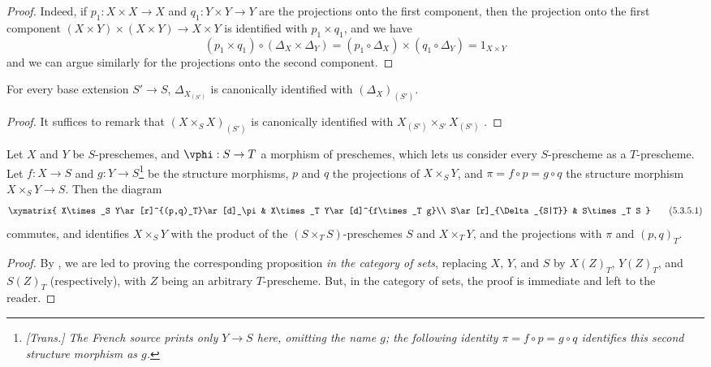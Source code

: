 \begin{proof}
Indeed, if $p_1:X\times X\to X$ and $q_1:Y\times Y\to Y$ are the projections onto the first component, then the projection onto the first component $(X\times Y)\times(X\times Y)\to X\times Y$ is identified with $p_1\times q_1$, and we have
\[
  (p_1\times q_1)\circ(\Delta_X\times\Delta_Y)=(p_1\circ\Delta_X)\times(q_1\circ\Delta_Y)=1_{X\times Y}
\]
and we can argue similarly for the projections onto the second component.
\end{proof}

\label{I.5.3.3}

\begin{corollary}[5.3.4]
\label{I.5.3.4}
For every base extension $S'\to S$, $\Delta_{X_{(S')}}$ is canonically identified with $(\Delta_X)_{(S')}$.
\end{corollary}

\begin{proof}
It suffices to remark that $(X\times_S X)_{(S')}$ is canonically identified with $X_{(S')}\times_{S'}X_{(S')}$ .
\end{proof}

\begin{proposition}[5.3.5]
\label{I.5.3.5}
Let $X$ and $Y$ be $S$-preschemes, and $\vphi:S\to T$ a morphism of preschemes, which lets us consider every $S$-prescheme as a $T$-prescheme.
Let $f:X\to S$ and $g:Y\to S$\footnote{\emph{[Trans.] The French source prints only $Y\to S$ here, omitting the name $g$; the following identity $\pi=f\circ p=g\circ q$ identifies this second structure morphism as $g$.}} be the structure morphisms, $p$ and $q$ the projections of $X\times_S Y$, and $\pi=f\circ p=g\circ q$ the structure morphism $X\times_S Y\to S$.
Then the diagram
\[
\label{I.5.3.5.1}
  \xymatrix{
    X\times_S Y\ar[r]^{(p,q)_T}\ar[d]_\pi &
    X\times_T Y\ar[d]^{f\times_T g}\\
    S\ar[r]_{\Delta_{S|T}} &
    S\times_T S
  }
  \tag{5.3.5.1}
\]
commutes, and identifies $X\times_S Y$ with the product of the $(S\times_T S)$-preschemes $S$ and $X\times_T Y$, and the projections with $\pi$ and $(p,q)_T$.
\end{proposition}

\begin{proof}
By , we are led to proving the corresponding proposition \emph{in the category of sets}, replacing $X$, $Y$, and $S$ by $X(Z)_T$, $Y(Z)_T$, and $S(Z)_T$ (respectively), with $Z$ being an arbitrary $T$-prescheme.
But, in the category of sets, the proof is immediate and left to the reader.
\end{proof}

